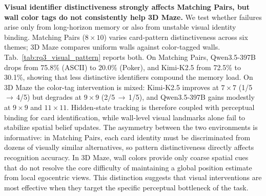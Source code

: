 \noindent\textbf{Visual identifier distinctiveness strongly affects Matching Pairs, but wall color tags do not consistently help 3D Maze.} We test whether failures arise only from long-horizon memory or also from unstable visual identity binding. Matching Pairs ($8{\times}10$) varies card-pattern distinctiveness across six themes; 3D Maze compares uniform walls against color-tagged walls. Tab.~\ref{tab:rq3_visual_pattern} reports both. On Matching Pairs, Qwen3.5-397B drops from 75.8\% (ASCII) to 20.0\% (Poker), and Kimi-K2.5 from 72.5\% to 30.1\%, showing that less distinctive identifiers compound the memory load. On 3D Maze the color-tag intervention is mixed: Kimi-K2.5 improves at $7{\times}7$ (1/5\,$\to$\,4/5) but degrades at $9{\times}9$ (2/5\,$\to$\,1/5), and Qwen3.5-397B gains modestly at $9{\times}9$ and $11{\times}11$. Hidden-state tracking is therefore coupled with perceptual binding for card identification, while wall-level visual landmarks alone fail to stabilize spatial belief updates. The asymmetry between the two environments is informative: in Matching Pairs, each card identity must be discriminated from dozens of visually similar alternatives, so pattern distinctiveness directly affects recognition accuracy. In 3D Maze, wall colors provide only coarse spatial cues that do not resolve the core difficulty of maintaining a global position estimate from local egocentric views. This distinction suggests that visual interventions are most effective when they target the specific perceptual bottleneck of the task.




